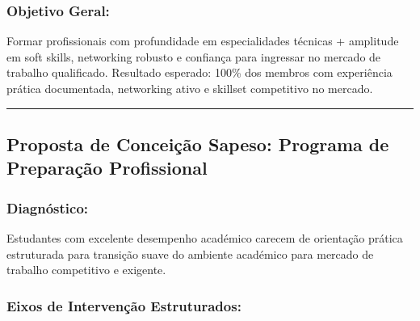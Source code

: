 \documentclass[12pt,a4paper]{article}
\begin{document}
\subsubsection*{Objetivo Geral:}
Formar profissionais com profundidade em especialidades técnicas + amplitude em soft skills, networking robusto e confiança para ingressar no mercado de trabalho qualificado. Resultado esperado: 100\% dos membros com experiência prática documentada, networking ativo e skillset competitivo no mercado.

\textcolor{spe-secondary}{\hspace{0.5cm}\rule{0.4\linewidth}{0.8pt}}
\subsection{Proposta de Conceição Sapeso: Programa de Preparação Profissional}

\subsubsection*{Diagnóstico:}
Estudantes com excelente desempenho académico carecem de orientação prática estruturada para transição suave do ambiente académico para mercado de trabalho competitivo e exigente.

\subsubsection*{Eixos de Intervenção Estruturados:}
\end{document}
